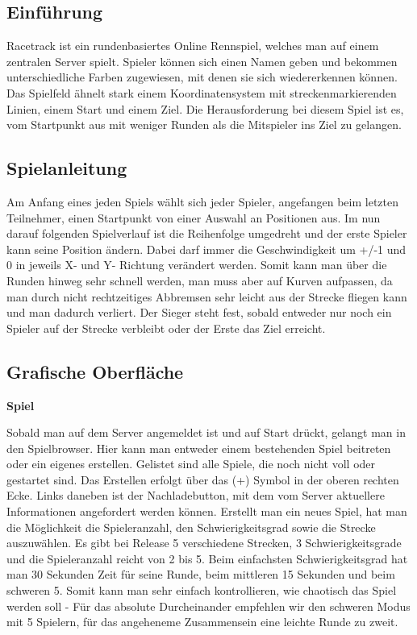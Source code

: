 \documentclass[a0, portrait, english, ngerman]{a0poster}
\begin{document}
\begin{multicols}{3}
\large
\section{Einführung}

Racetrack ist ein rundenbasiertes Online Rennspiel, welches man auf einem zentralen Server spielt. Spieler können sich einen Namen geben und bekommen unterschiedliche Farben zugewiesen, mit denen sie sich wiedererkennen können. Das Spielfeld ähnelt stark einem Koordinatensystem mit streckenmarkierenden Linien, einem Start und einem Ziel. Die Herausforderung bei diesem Spiel ist es, vom Startpunkt aus mit weniger Runden als die Mitspieler ins Ziel zu gelangen.\\

\subsection{Spielanleitung}

Am Anfang eines jeden Spiels wählt sich jeder Spieler, angefangen beim letzten Teilnehmer, einen Startpunkt von einer Auswahl an Positionen aus. Im nun darauf folgenden Spielverlauf ist die Reihenfolge umgedreht und der erste Spieler kann seine Position ändern. Dabei darf immer die Geschwindigkeit um +/-1 und 0 in jeweils X- und Y- Richtung verändert werden. Somit kann man über die Runden hinweg sehr schnell werden, man muss aber auf Kurven aufpassen, da man durch nicht rechtzeitiges Abbremsen sehr leicht aus der Strecke fliegen kann und man dadurch verliert. Der Sieger steht fest, sobald entweder nur noch ein Spieler auf der Strecke verbleibt oder der Erste das Ziel erreicht.\\

\subsection{Grafische Oberfläche}
    
\begin{center}
	\textbf{Spiel}
\end{center}

Sobald man auf dem Server angemeldet ist und auf Start drückt, gelangt man in den Spielbrowser. Hier kann man entweder einem bestehenden Spiel beitreten oder ein eigenes erstellen. Gelistet sind alle Spiele, die noch nicht voll oder gestartet sind. Das Erstellen erfolgt über das (+) Symbol in der oberen rechten Ecke. Links daneben ist der Nachladebutton, mit dem vom Server aktuellere Informationen angefordert werden können. Erstellt man ein neues Spiel, hat man die Möglichkeit die Spieleranzahl, den Schwierigkeitsgrad sowie die Strecke auszuwählen. Es gibt bei Release 5 verschiedene Strecken, 3 Schwierigkeitsgrade und die Spieleranzahl reicht von 2 bis 5. Beim einfachsten Schwierigkeitsgrad hat man 30 Sekunden Zeit für seine Runde, beim mittleren 15 Sekunden und beim schweren 5. Somit kann man sehr einfach kontrollieren, wie chaotisch das Spiel werden soll - Für das absolute Durcheinander empfehlen wir den schweren Modus mit 5 Spielern, für das angeheneme Zusammensein eine leichte Runde zu zweit.\\


\end{multicols}
\end{document}
